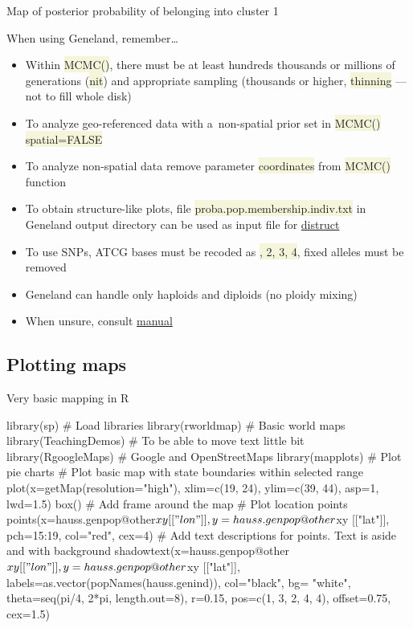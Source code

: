 \documentclass[compress, ucs, xelatex, 11pt, xcolor=svgnames, aspectratio=169,
	hyperref={
		bookmarks=true,
		unicode=true,
		colorlinks=true,
		pdftitle={Molecular data in R},
		plainpages=false,
		pdfauthor={Vojtech Zeisek},
		pdfsubject={Course about phylogeny and evolution in R},
		pdfcreator={XeLaTeX},
		pdfkeywords={R, evolution, phylogeny, molecular data},
		linkcolor=Crimson, %
		anchorcolor=Magenta, %
		citecolor=Magenta, %
		filecolor=Magenta, %
		menucolor=Magenta, %
		urlcolor=DodgerBlue, %
		pdftex},
	url={hyphens, lowtilde} %
	]{beamer}
\renewcommand{\texttt}[1]{\colorbox{Beige}{{\ttfamily #1}}}
\begin{document}
\begin{frame}{Map of posterior probability of belonging into cluster 1}
	\begin{center}
		\texttt{[image: geneland2.png]}
	\end{center}
\end{frame}

\begin{frame}{When using Geneland, remember\ldots}
	\begin{itemize}
		\item Within \texttt{MCMC()}, there must be at least hundreds thousands or millions of generations (\texttt{nit}) and appropriate sampling (thousands or higher, \texttt{thinning} --- not to fill whole disk)
		\item To analyze geo-referenced data with a~non-spatial prior set in \texttt{MCMC()} \texttt{spatial=FALSE}
		\item To analyze non-spatial data remove parameter \texttt{coordinates} from \texttt{MCMC()} function
		\item To obtain structure-like plots, file \texttt{proba.pop.membership.indiv.txt} in Geneland output directory can be used as input file for \href{https://web.stanford.edu/group/rosenberglab/distruct.html}{distruct}
		\item To use SNPs, ATCG bases must be recoded as \texttt{1, 2, 3, 4}, fixed alleles must be removed
		\item Geneland can handle only haploids and diploids (no ploidy mixing)
		\item When unsure, consult \href{https://i-pri.org/special/Biostatistics/Software/Geneland/Geneland-Doc.pdf}{manual}
	\end{itemize}
\end{frame}

\subsection{Plotting maps}

\begin{frame}[fragile]{Very basic mapping in R}
	\begin{spluscode}
    library(sp) # Load libraries
    library(rworldmap) # Basic world maps
    library(TeachingDemos) # To be able to move text little bit
    library(RgoogleMaps) # Google and OpenStreetMaps
    library(mapplots) # Plot pie charts
    # Plot basic map with state boundaries within selected range
    plot(x=getMap(resolution="high"), xlim=c(19, 24), ylim=c(39, 44), asp=1,
      lwd=1.5)
    box() # Add frame around the map
    # Plot location points
    points(x=hauss.genpop@other$xy[["lon"]], y=hauss.genpop@other$xy [["lat"]],
      pch=15:19, col="red", cex=4)
    # Add text descriptions for points. Text is aside and with background
    shadowtext(x=hauss.genpop@other$xy[["lon"]], y=hauss.genpop@other$xy
      [["lat"]], labels=as.vector(popNames(hauss.genind)), col="black", bg=
      "white", theta=seq(pi/4, 2*pi, length.out=8), r=0.15, pos=c(1, 3, 2, 4,
      4), offset=0.75, cex=1.5)
	\end{spluscode}
\end{frame}
\end{document}
